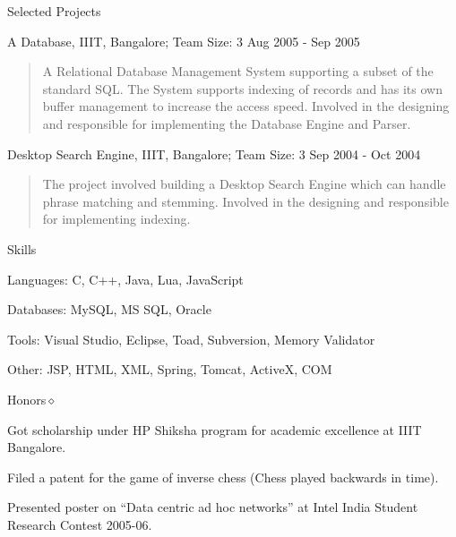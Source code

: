 \documentclass{resume}
\newcommand{\teamsize}{\sc\footnotesize Team Size: }
\begin{document}
\begin{category}{Selected Projects}{}
    \item {\topic A Database,} IIIT, Bangalore; %
        {\teamsize 3}
        {\period Aug 2005 - Sep 2005}
        \begin{quote}
            A Relational Database Management System supporting a subset of the
            standard SQL. The System supports indexing of records and has its
            own buffer management to increase the access speed.  Involved in
            the designing and responsible for implementing the Database Engine
            and Parser.
        \end{quote}

    \item {\topic Desktop Search Engine,} IIIT, Bangalore;
        {\teamsize 3}
        {\period Sep 2004 - Oct 2004}
        \begin{quote}
            The project involved building a Desktop Search Engine which can
            handle phrase matching and stemming.  Involved in the designing and
            responsible for implementing indexing.
        \end{quote}

\end{category}


\begin{category}{Skills}{}

    \item {\topic Languages:} C, C++, Java, Lua, JavaScript
    \item {\topic Databases:} MySQL, MS SQL, Oracle
    \item {\topic Tools:} Visual Studio,  Eclipse, Toad, Subversion, Memory
        Validator
    \item {\topic Other:} JSP, HTML, XML, Spring, Tomcat,  ActiveX, COM

\end{category}


\begin{category}{Honors}{$\diamond$}

    \item Got scholarship under HP Shiksha program for academic excellence at
        IIIT Bangalore.

    \item Filed a patent for the game of inverse chess (Chess played backwards
        in time).

    \item Presented poster on ``Data centric ad hoc networks'' at Intel India
        Student Research Contest 2005-06.

\end{category}
\end{document}
